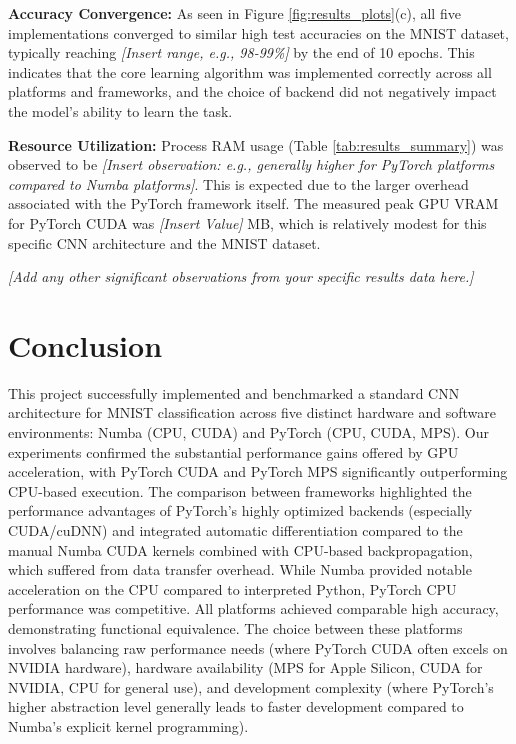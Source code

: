\documentclass[conference]{IEEEtran} %
\begin{document}
\textbf{Accuracy Convergence:} As seen in Figure \ref{fig:results_plots}(c), all five implementations converged to similar high test accuracies on the MNIST dataset, typically reaching \textit{[Insert range, e.g., 98-99\%]} by the end of 10 epochs. This indicates that the core learning algorithm was implemented correctly across all platforms and frameworks, and the choice of backend did not negatively impact the model's ability to learn the task.

\textbf{Resource Utilization:} Process RAM usage (Table \ref{tab:results_summary}) was observed to be \textit{[Insert observation: e.g., generally higher for PyTorch platforms compared to Numba platforms]}. This is expected due to the larger overhead associated with the PyTorch framework itself. The measured peak GPU VRAM for PyTorch CUDA was \textit{[Insert Value]} MB, which is relatively modest for this specific CNN architecture and the MNIST dataset.

\textit{[Add any other significant observations from your specific results data here.]}

\section{Conclusion}
\label{sec:conclusion}
This project successfully implemented and benchmarked a standard CNN architecture for MNIST classification across five distinct hardware and software environments: Numba (CPU, CUDA) and PyTorch (CPU, CUDA, MPS). Our experiments confirmed the substantial performance gains offered by GPU acceleration, with PyTorch CUDA and PyTorch MPS significantly outperforming CPU-based execution. The comparison between frameworks highlighted the performance advantages of PyTorch's highly optimized backends (especially CUDA/cuDNN) and integrated automatic differentiation compared to the manual Numba CUDA kernels combined with CPU-based backpropagation, which suffered from data transfer overhead. While Numba provided notable acceleration on the CPU compared to interpreted Python, PyTorch CPU performance was competitive. All platforms achieved comparable high accuracy, demonstrating functional equivalence. The choice between these platforms involves balancing raw performance needs (where PyTorch CUDA often excels on NVIDIA hardware), hardware availability (MPS for Apple Silicon, CUDA for NVIDIA, CPU for general use), and development complexity (where PyTorch's higher abstraction level generally leads to faster development compared to Numba's explicit kernel programming).
\end{document}
